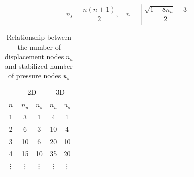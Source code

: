 \begin{equation}
n_s = \frac{n(n + 1)}{2}, \quad
n = \left\lfloor \frac{\sqrt{1 + 8n_u} - 3}{2} \right\rfloor
\end{equation}

\begin{table}[ht!]
\centering
\caption{Relationship between the number of displacement nodes $n_u$ and stabilized number of pressure nodes $n_s$}
\label{tab:constraint}
\begin{tabular}{ccccc}
\toprule
& \multicolumn{2}{c}{2D} & \multicolumn{2}{c}{3D} \\
$n$ & $n_u$ & $n_s$ & $n_u$ & $n_s$ \\
\midrule
1 & 3 & 1 & 4 & 1 \\
2 & 6 & 3 & 10 & 4 \\
3 & 10 & 6 & 20 & 10 \\
4 & 15 & 10 & 35 & 20 \\
\vdots & \vdots & \vdots & \vdots & \vdots \\
\bottomrule
\end{tabular}
\end{table}

